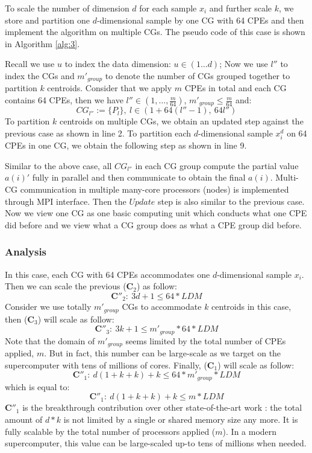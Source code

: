 To scale the number of dimension $d$ for each sample $x_i$ and further scale $k$, we store and partition one $d$-dimensional sample by one CG with 64 CPEs and then implement the algorithm on multiple CGs.  The pseudo code of this case is shown in Algorithm \ref{alg:3}.

Recall we use $u$ to index the data dimension: $u \in (1\ldots d)$; Now we use $l''$ to index the CGs and $m'_{group}$ to denote the number of CGs grouped together to partition $k$ centroids. Consider that  we apply $m$ CPEs in total and each CG contains 64 CPEs, then we have $l'' \in (1, \ldots,\frac{m}{64})$, $m'_{group} \leq \frac{m}{64}$ and:
$$CG_{l''} := \{P_l\},\ l \in (1+64(l''-1),\ 64l'') $$
To partition $k$ centroids on multiple CGs, we obtain an updated step against the previous case as shown in line 2.
To partition each $d$-dimensional sample $x^d_i$ on 64 CPEs in one CG, we obtain the following step as shown in line 9.

Similar to the above case, all $CG_{l''}$ in each CG group compute the partial value $a(i)'$ fully in parallel and then communicate to obtain the final $a(i)$.
Multi-CG communication in multiple many-core processors (nodes) is implemented through MPI interface. Then the $Update$ step is also similar to the previous case. Now we view one CG as one basic computing unit which conducts what one CPE did before and we view what a CG group does as what a CPE group did before.

\subsubsection*{Analysis} 
In this case, each CG with 64 CPEs accommodates one $d$-dimensional sample $x_i$. Then we can scale the previous ($\mathbf{C}_2$) as follow:
$$\mathbf{C''}_2:\ 3d+1 \leq 64 *LDM  $$
Consider we use totally $m'_{group}$ CGs to accommodate $k$ centroids in this case, then ($\mathbf{C}_3$) will scale as follow: 
$$\mathbf{C''}_3:\ 3k+1 \leq {m'}_{group} *64*LDM  $$
Note that the domain of $m'_{group}$ seems limited by the total number of CPEs applied, $m$. But in fact, this number can be large-scale as we target on the supercomputer with tens of millions of cores. Finally, ($\mathbf{C}_1$) will scale as follow:
$$\mathbf{C''}_1:\ d(1+k+k)+k \leq 64*m'_{group}*LDM  $$
which is equal to:
$$\mathbf{C''}_1:\ d(1+k+k)+k \leq m*LDM  $$
$\mathbf{C''}_1$ is the breakthrough contribution over other state-of-the-art work \cite{bender2015k}: the total amount of $d*k$ is not limited by a single or shared memory size any more. It is fully scalable by the total number of processors applied ($m$). In a modern supercomputer, this value can be large-scaled up-to tens of millions when needed.  

